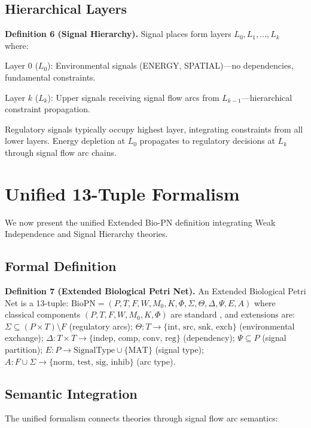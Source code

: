 \documentclass[twocolumn,11pt]{article}
\begin{document}
\subsection{Hierarchical Layers}

\textbf{Definition 6 (Signal Hierarchy).} Signal places form layers $L_0, L_1, \ldots, L_k$ where:

Layer 0 ($L_0$): Environmental signals (ENERGY, SPATIAL)---no dependencies, fundamental constraints.

Layer $k$ ($L_k$): Upper signals receiving signal flow arcs from $L_{k-1}$---hierarchical constraint propagation.

Regulatory signals typically occupy highest layer, integrating constraints from all lower layers. Energy depletion at $L_0$ propagates to regulatory decisions at $L_k$ through signal flow arc chains.

\section{Unified 13-Tuple Formalism}

We now present the unified Extended Bio-PN definition integrating Weak Independence and Signal Hierarchy theories.

\subsection{Formal Definition}

\textbf{Definition 7 (Extended Biological Petri Net).} An Extended Biological Petri Net is a 13-tuple: $\text{BioPN} = (P, T, F, W, M_0, K, \Phi, \Sigma, \Theta, \Delta, \Psi, E, A)$ where classical components $(P, T, F, W, M_0, K, \Phi)$ are standard \cite{Reisig2013}, and extensions are: $\Sigma \subseteq (P \times T) \setminus F$ (regulatory arcs); $\Theta: T \rightarrow \{\text{int, src, snk, exch}\}$ (environmental exchange); $\Delta: T \times T \rightarrow \{\text{indep, comp, conv, reg}\}$ (dependency); $\Psi \subseteq P$ (signal partition); $E: P \rightarrow \text{SignalType} \cup \{\text{MAT}\}$ (signal type); $A: F \cup \Sigma \rightarrow \{\text{norm, test, sig, inhib}\}$ (arc type).

\subsection{Semantic Integration}

The unified formalism connects theories through signal flow arc semantics:
\end{document}

